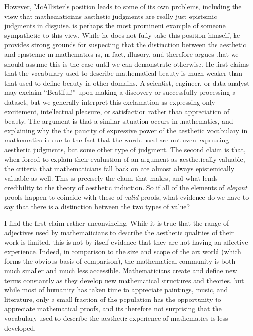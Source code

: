 \documentclass[a4paper,man,natbib]{apa6}
\begin{document}
However, McAllister's position leads to some of its own problems, including the view that mathematicians aesthetic
judgments are really just epistemic judgments in disguise. \cite{todd_unmasking_2008} is perhaps the most prominent
example of someone sympathetic to this view. While he does not fully take this position himself, he provides 
strong grounds for suspecting that the distinction between the aesthetic and epistemic in mathematics is, in fact,
illusory, and therefore argues that we should assume this is the case until we can demonstrate otherwise. He first 
claims that the vocabulary used to
describe mathematical beauty is much weaker than that used to define beauty in other domains. A scientist, engineer,
or data analyst may exclaim ``Beatiful!'' upon making a discovery or successfully processing a dataset, but we generally
interpret this exclamation as expressing only excitement, intellectual pleasure, or satisfaction rather than appreciation
of beauty. The argument is that a similar situation occurs in mathematics, and explaining why the the paucity of expressive
power of the aesthetic vocabulary in mathematics
is due to the fact that the words used are not even expressing aesthetic judgments, but some other type of judgment. The
second claim is that, when forced to explain their evaluation of an argument
as aesthetically valuable, the criteria that mathematicians fall back on are almost always epistemically valuable as well.
This is precisely the claim that \cite{mcallister_mathematical_2005} makes, and what lends credibility to the theory
of aesthetic induction. So if all of the elements of \textit{elegant} proofs happen to coincide with those of 
\textit{valid} proofs, what evidence do we have to say that there is a distinction between the two types of value?

I find the first claim rather unconvincing. While it is true that the range of adjectives used by mathematicians to describe
the aesthetic qualities of their work is limited, this is not by itself evidence that they are not having an affective
experience. Indeed, in comparison to the size and scope of the art world (which forms the obvious basis of comparison),
the mathematical community is both much smaller and much less accessible. Mathematicians create and define new terms
constantly as they develop new mathematical structures and theories, but while most of humanity has taken time to 
appreciate paintings, music, and literature, only a small fraction of the population has the opportunity to appreciate
mathematical proofs, and its therefore not surprising that the vocabulary used to describe the aesthetic experience
of mathematics is less developed.
\end{document}
